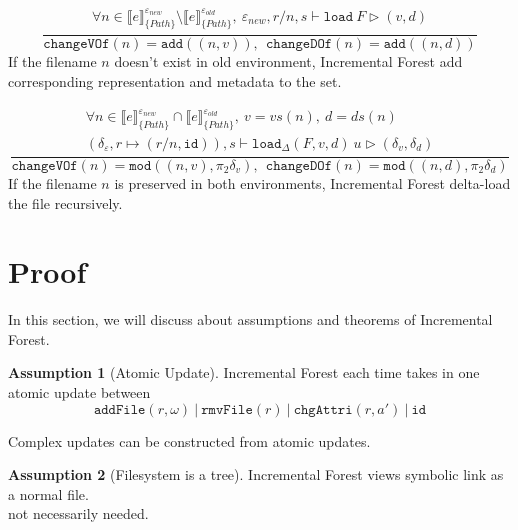 \documentclass[10pt,twoside,a4paper]{article}
\theoremstyle{theorem}
\theoremstyle{lemma}
\theoremstyle{property}
\theoremstyle{definition}
\theoremstyle{assumption}
\newtheorem{assumption}{Assumption}[section]
\def\snd{\pi_2}
\def\id{\mathtt{id}}
\begin{document}
\begin{displaymath}
	\frac{\begin{array}{c}
	\forall n \in \llbracket e \rrbracket^{\varepsilon_{new}}_{\{Path\}} \setminus \llbracket e \rrbracket^{\varepsilon_{old}}_{\{Path\}}, ~ \varepsilon_{new}, r/n,s \vdash \mathtt{load}~F \rhd (v, d)
	\end{array}}
	{\mathtt{changeVOf}(n) = \mathtt{add}((n,v)), ~~\mathtt{changeDOf}(n) = \mathtt{add}((n,d))}
\end{displaymath}
If the filename $n$ doesn't exist in old environment, Incremental Forest add corresponding representation and metadata to the set.

\begin{displaymath}
	\frac{\begin{array}{c}
	\forall n \in \llbracket e \rrbracket^{\varepsilon_{new}}_{\{Path\}} \cap \llbracket e \rrbracket^{\varepsilon_{old}}_{\{Path\}}, ~ v = vs(n), ~d = ds(n)\\
	(\delta_\varepsilon, r \mapsto (r/n, \id)), s \vdash \mathtt{load}_\Delta (F,v,d)~ u \rhd (\delta_v,\delta_d)
	\end{array}}
	{\mathtt{changeVOf}(n) = \mathtt{mod}((n,v), \snd\delta_v), ~~\mathtt{changeDOf}(n) = \mathtt{mod}((n,d), \snd\delta_d)}
\end{displaymath}
If the filename $n$ is preserved in both environments, Incremental Forest delta-load the file recursively.

\newpage
\section{Proof}
In this section, we will discuss about assumptions and theorems of Incremental Forest.
\begin{assumption}[Atomic Update]
	Incremental Forest each time takes in one atomic update between 
	\begin{displaymath}
		\mathtt{addFile}(r,\omega) ~|~ \mathtt{rmvFile}(r) ~|~ \mathtt{chgAttri}(r,a') ~|~  \mathtt{id}
	\end{displaymath}

\end{assumption}

Complex updates can be constructed from atomic updates.

\begin{assumption}[Filesystem is a tree]
	Incremental Forest views symbolic link as a normal file. \\
	not necessarily needed.
\end{assumption}
\end{document}
